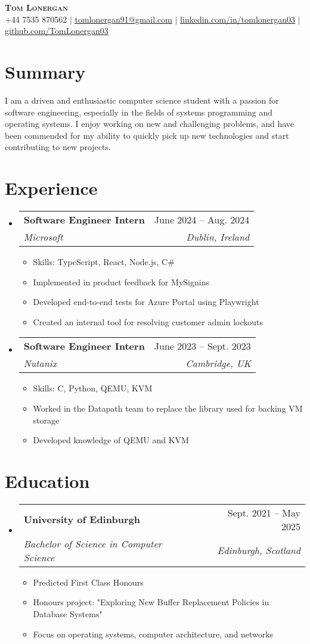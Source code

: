 \documentclass[letterpaper,11pt]{article}
\makeatletter
\newcommand{\resumeItem}[1]{
  \item\small{
    {#1 \vspace{-2pt}}
  }
}
\newcommand{\resumeSubheading}[4]{
  \vspace{-2pt}\item
    \begin{tabular*}{0.97\textwidth}[t]{l@{\extracolsep{\fill}}r}
      \textbf{#1} & #2 \\
      \textit{\small#3} & \textit{\small #4} \\
    \end{tabular*}\vspace{-7pt}
}
\newcommand{\resumeSubHeadingListStart}{\begin{itemize}[leftmargin=0.15in, label={}]}
\newcommand{\resumeSubHeadingListEnd}{\end{itemize}}
\newcommand{\resumeItemListStart}{\begin{itemize}}
\newcommand{\resumeItemListEnd}{\end{itemize}\vspace{-5pt}}
\makeatother
\begin{document}
\begin{center}
    \textbf{\Huge \scshape Tom Lonergan} \\ \vspace{1pt}
    \small +44 7535 870562 $|$ \href{mailto:tomlonergan91@gmail.com}{\underline{tomlonergan91@gmail.com}} $|$ 
    \href{https://linkedin.com/in/tomlonergan03}{\underline{linkedin.com/in/tomlonergan03}} $|$
    \href{https://github.com/TomLonergan03}{\underline{github.com/TomLonergan03}}
\end{center}

\section{Summary}
I am a driven and enthusiastic computer science student with a passion for software engineering, especially in the fields of systems programming and operating systems. I enjoy working on new and challenging problems, and have been commended for my ability to quickly pick up new technologies and start contributing to new projects. 

\section{Experience}
  \resumeSubHeadingListStart

    \resumeSubheading
      {Software Engineer Intern}{June 2024 -- Aug. 2024}
      {Microsoft}{Dublin, Ireland}
      \resumeItemListStart
        \resumeItem{Skills: TypeScript, React, Node.js, C\#}
        \resumeItem{Implemented in product feedback for MySignins}
        \resumeItem{Developed end-to-end tests for Azure Portal using Playwright}
        \resumeItem{Created an internal tool for resolving customer admin lockouts}
      \resumeItemListEnd

    \resumeSubheading
      {Software Engineer Intern}{June 2023 -- Sept. 2023}
      {Nutanix}{Cambridge, UK}
      \resumeItemListStart
        \resumeItem{Skills: C, Python, QEMU, KVM}
        \resumeItem{Worked in the Datapath team to replace the library used for backing VM storage}
        \resumeItem{Developed knowledge of QEMU and KVM}
    \resumeItemListEnd

  \resumeSubHeadingListEnd

\section{Education}
  \resumeSubHeadingListStart
    \resumeSubheading
      {University of Edinburgh}{Sept. 2021 -- May 2025}
      {Bachelor of Science in Computer Science}{Edinburgh, Scotland}
      \resumeItemListStart
        \resumeItem{Predicted First Class Honours}
        \resumeItem{Honours project: "Exploring New Buffer Replacement Policies in Database Systems"}
        \resumeItem{Focus on operating systems, computer architecture, and networks}
      \resumeItemListEnd
  \resumeSubHeadingListEnd
\end{document}
